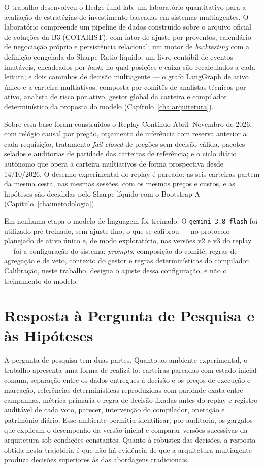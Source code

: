 \documentclass{eic-bcc-tcc}
\begin{document}
O trabalho desenvolveu o Hedge-fund-lab, um laboratório quantitativo para a avaliação de estratégias de investimento baseadas em sistemas multiagentes. O laboratório compreende um pipeline de dados construído sobre o arquivo oficial de cotações da B3 (COTAHIST), com fator de ajuste por proventos, calendário de negociação próprio e persistência relacional; um motor de \textit{backtesting} com a definição congelada do Sharpe Ratio líquido; um livro contábil de eventos imutáveis, encadeados por \textit{hash}, no qual posições e caixa são recalculados a cada leitura; e dois caminhos de decisão multiagente --- o grafo LangGraph de ativo único e a carteira multiativos, composta por comitês de analistas técnicos por ativo, analista de risco por ativo, gestor global da carteira e compilador determinístico da proposta do modelo (Capítulo~\ref{cha:arquitetura}).

Sobre essa base foram construídos o Replay Contínuo Abril--Novembro de 2026, com relógio causal por pregão, orçamento de inferência com reserva anterior a cada requisição, tratamento \textit{fail-closed} de pregões sem decisão válida, pacotes selados e auditorias de paridade das carteiras de referência; e o ciclo diário autônomo que opera a carteira multiativos de forma prospectiva desde 14/10/2026. O desenho experimental do replay é pareado: as seis carteiras partem da mesma cesta, nas mesmas sessões, com os mesmos preços e custos, e as hipóteses são decididas pelo Sharpe líquido com o Bootstrap A (Capítulo~\ref{cha:metodologia}).

Em nenhuma etapa o modelo de linguagem foi treinado. O \texttt{gemini-3.8-flash} foi utilizado pré-treinado, sem ajuste fino; o que se calibrou --- no protocolo planejado de ativo único e, de modo exploratório, nas versões v2 e v3 do replay --- foi a configuração do sistema: \textit{prompts}, composição do comitê, regras de agregação e de veto, contexto do gestor e regras determinísticas do compilador. Calibração, neste trabalho, designa o ajuste dessa configuração, e não o treinamento do modelo.

\section{Resposta à Pergunta de Pesquisa e às Hipóteses}

A pergunta de pesquisa tem duas partes. Quanto ao ambiente experimental, o trabalho apresenta uma forma de realizá-lo: carteiras pareadas com estado inicial comum, separação entre os dados entregues à decisão e os preços de execução e marcação, referências determinísticas reproduzidas com paridade exata entre campanhas, métrica primária e regra de decisão fixadas antes do replay e registro auditável de cada voto, parecer, intervenção do compilador, operação e patrimônio diário. Esse ambiente permitiu identificar, por auditoria, os gargalos que explicam o desempenho da versão inicial e comparar versões sucessivas da arquitetura sob condições constantes. Quanto à robustez das decisões, a resposta obtida nesta trajetória é que não há evidência de que a arquitetura multiagente produza decisões superiores às das abordagens tradicionais.
\end{document}
